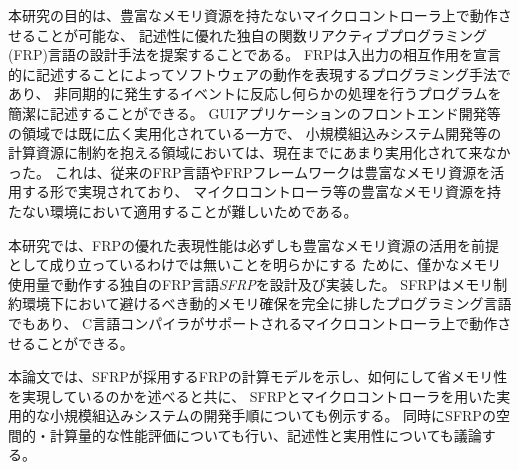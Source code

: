 本研究の目的は、豊富なメモリ資源を持たないマイクロコントローラ上で動作させることが可能な、
記述性に優れた独自の関数リアクティブプログラミング(FRP)言語の設計手法を提案することである。
FRPは入出力の相互作用を宣言的に記述することによってソフトウェアの動作を表現するプログラミング手法であり、
非同期的に発生するイベントに反応し何らかの処理を行うプログラムを簡潔に記述することができる。
GUIアプリケーションのフロントエンド開発等の領域では既に広く実用化されている一方で、
小規模組込みシステム開発等の計算資源に制約を抱える領域においては、現在までにあまり実用化されて来なかった。
これは、従来のFRP言語やFRPフレームワークは豊富なメモリ資源を活用する形で実現されており、
マイクロコントローラ等の豊富なメモリ資源を持たない環境において適用することが難しいためである。

本研究では、FRPの優れた表現性能は必ずしも豊富なメモリ資源の活用を前提として成り立っているわけでは無いことを明らかにする
ために、僅かなメモリ使用量で動作する独自のFRP言語{\it SFRP}を設計及び実装した。
SFRPはメモリ制約環境下において避けるべき動的メモリ確保を完全に排したプログラミング言語でもあり、
C言語コンパイラがサポートされるマイクロコントローラ上で動作させることができる。

本論文では、SFRPが採用するFRPの計算モデルを示し、如何にして省メモリ性を実現しているのかを述べると共に、
SFRPとマイクロコントローラを用いた実用的な小規模組込みシステムの開発手順についても例示する。
同時にSFRPの空間的・計算量的な性能評価についても行い、記述性と実用性についても議論する。
